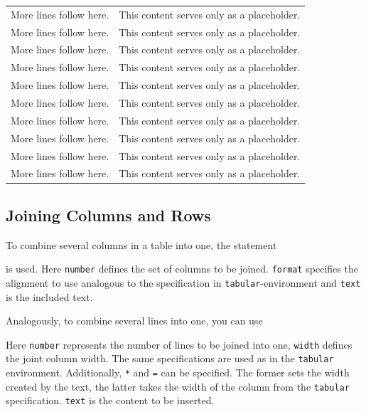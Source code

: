 \begin{block}
\begin{longtable}{@{}lp{}@{}}
    More lines follow here. & This content serves only as a placeholder. \\
		More lines follow here. & This content serves only as a placeholder. \\
    More lines follow here. & This content serves only as a placeholder. \\
    More lines follow here. & This content serves only as a placeholder. \\
    More lines follow here. & This content serves only as a placeholder. \\
    More lines follow here. & This content serves only as a placeholder. \\
    More lines follow here. & This content serves only as a placeholder. \\
    More lines follow here. & This content serves only as a placeholder. \\
    More lines follow here. & This content serves only as a placeholder. \\
    More lines follow here. & This content serves only as a placeholder. \\
    \bottomrule
\end{longtable}
\end{block}



\subsection{Joining Columns and Rows}

To combine several columns in a table into one, the statement
%
\begin{GenericCode}[numbers=none]
\end{GenericCode}
%
is used. Here \texttt{number} defines the set of columns to be joined.
\texttt{format} specifies the alignment to use analogous to the specification
in \texttt{tabular}-environment and \texttt{text} is the included text.

Analogously, to combine several lines into one, you can use
%
\begin{GenericCode}[numbers=none]
\end{GenericCode}
%
Here \texttt{number} represents the number of lines to be joined into one,
\texttt{width} defines the joint column width. The same specifications are
used as in the \texttt{tabular} environment. Additionally, \texttt{*} and
\texttt{=} can be specified. The former sets the width created by the text,
the latter takes the width of the column from the \texttt{tabular}
specification. \texttt{text} is the content to be inserted.

